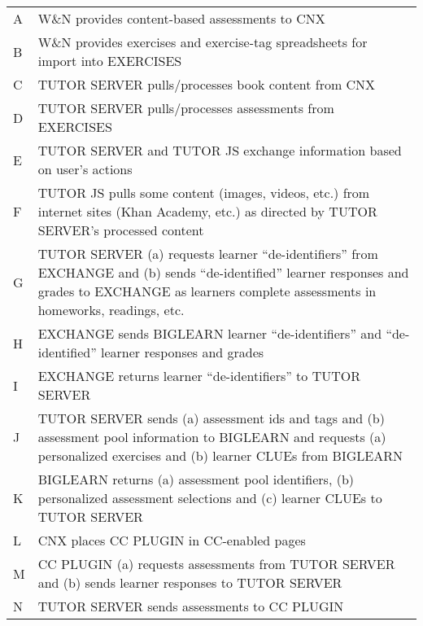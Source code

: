 \documentclass[a4paper,10pt]{minimal}
\begin{document}
\vspace{1cm}

\begin{tabular}{ p{0.5in} p{6.5in} }
  A & W\&N provides content-based assessments to CNX \\
  B & W\&N provides exercises and exercise-tag spreadsheets
      for import into EXERCISES \\
  C & TUTOR SERVER pulls/processes book content from CNX \\
  D & TUTOR SERVER pulls/processes assessments from EXERCISES \\
  E & TUTOR SERVER and TUTOR JS exchange information based on user's actions \\
  F & TUTOR JS pulls some content (images, videos, etc.)
      from internet sites (Khan Academy, etc.)
      as directed by TUTOR SERVER's processed content \\
  G & TUTOR SERVER (a) requests learner ``de-identifiers'' from EXCHANGE and
                   (b) sends ``de-identified'' learner responses and grades to EXCHANGE
                       as learners complete assessments in homeworks, readings, etc. \\
  H & EXCHANGE sends BIGLEARN learner ``de-identifiers''
      and ``de-identified'' learner responses and grades \\
  I & EXCHANGE returns learner ``de-identifiers'' to TUTOR SERVER \\
  J & TUTOR SERVER sends (a) assessment ids and tags and
                         (b) assessment pool information
      to BIGLEARN and requests (a) personalized exercises and
                               (b) learner CLUEs
      from BIGLEARN \\
  K & BIGLEARN returns (a) assessment pool identifiers,
                       (b) personalized assessment selections and
                       (c) learner CLUEs
      to TUTOR SERVER \\
  L & CNX places CC PLUGIN in CC-enabled pages \\
  M & CC PLUGIN (a) requests assessments from TUTOR SERVER and
                (b) sends learner responses to TUTOR SERVER \\
  N & TUTOR SERVER sends assessments to CC PLUGIN
\end{tabular}
\end{document}
